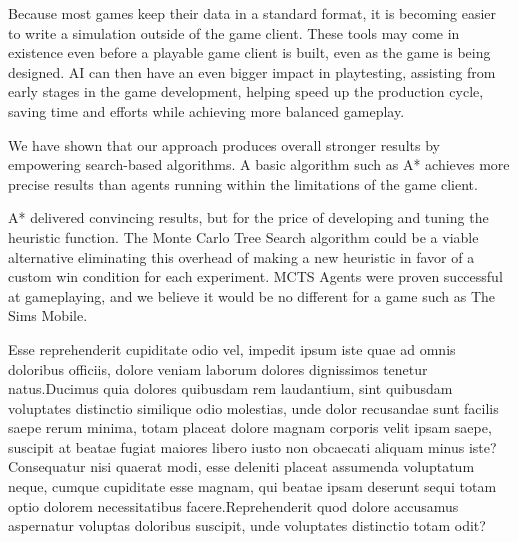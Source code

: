 \documentclass[letterpaper]{article} %
\begin{document}
Because most games keep their data in a standard format, it is becoming easier to write a simulation outside of the game client. These tools may come in existence even before a playable game client is built, even as the game is being designed. AI can then have an even bigger impact in playtesting, assisting from early stages in the game development, helping speed up the production cycle, saving time and efforts while achieving more balanced gameplay.
%
%

We have shown that our approach produces overall stronger results by empowering search-based algorithms. A basic algorithm such as A* achieves more precise results than agents running within the limitations of the game client.

A* delivered convincing results, but for the price of developing and tuning the heuristic function. The Monte Carlo Tree Search algorithm could be a viable alternative eliminating this overhead of making a new heuristic in favor of a custom win condition for each experiment. MCTS Agents were proven successful at gameplaying, and we believe it would be no different for a game such as The Sims Mobile.

Esse reprehenderit cupiditate odio vel, impedit ipsum iste quae ad omnis doloribus officiis, dolore veniam laborum dolores dignissimos tenetur natus.Ducimus quia dolores quibusdam rem laudantium, sint quibusdam voluptates distinctio similique odio molestias, unde dolor recusandae sunt facilis saepe rerum minima, totam placeat dolore magnam corporis velit ipsam saepe, suscipit at beatae fugiat maiores libero iusto non obcaecati aliquam minus iste?Consequatur nisi quaerat modi, esse deleniti placeat assumenda voluptatum neque, cumque cupiditate esse magnam, qui beatae ipsam deserunt sequi totam optio dolorem necessitatibus facere.Reprehenderit quod dolore accusamus aspernatur voluptas doloribus suscipit, unde voluptates distinctio totam odit?\clearpage


\end{document}
